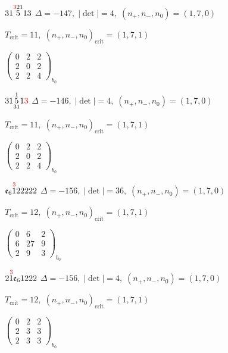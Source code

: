 \documentclass[10pt]{article}
\begin{document}
$31\overset{\textcolor{red}{3}21}{5}13$ \quad $\Delta=-147,\; |\det|=4,\; (n_+,n_-,n_0)=(1,7,0)$

\hspace{1em}$T_{\text{crit}}=11,\; (n_+,n_-,n_0)_{\text{crit}}=(1,7,1)$

\hspace{2em}$\left(\begin{smallmatrix}0 & 2 & 2 \\ 2 & 0 & 2 \\ 2 & 2 & 4\end{smallmatrix}\right)_{\!b_0}$

\smallskip

$31\overset{1}{\underset{31}{5}}1\textcolor{red}{3}$ \quad $\Delta=-146,\; |\det|=4,\; (n_+,n_-,n_0)=(1,7,0)$

\hspace{1em}$T_{\text{crit}}=11,\; (n_+,n_-,n_0)_{\text{crit}}=(1,7,1)$

\hspace{2em}$\left(\begin{smallmatrix}0 & 2 & 2 \\ 2 & 0 & 2 \\ 2 & 2 & 4\end{smallmatrix}\right)_{\!b_0}$

\smallskip

$\mathfrak{e}_6\overset{\textcolor{red}{3}}{1}22222$ \quad $\Delta=-156,\; |\det|=36,\; (n_+,n_-,n_0)=(1,7,0)$

\hspace{1em}$T_{\text{crit}}=12,\; (n_+,n_-,n_0)_{\text{crit}}=(1,7,1)$

\hspace{2em}$\left(\begin{smallmatrix}0 & 6 & 2 \\ 6 & 27 & 9 \\ 2 & 9 & 3\end{smallmatrix}\right)_{\!b_0}$

\smallskip

$2\overset{\textcolor{red}{3}}{1}\mathfrak{e}_61222$ \quad $\Delta=-156,\; |\det|=4,\; (n_+,n_-,n_0)=(1,7,0)$

\hspace{1em}$T_{\text{crit}}=12,\; (n_+,n_-,n_0)_{\text{crit}}=(1,7,1)$

\hspace{2em}$\left(\begin{smallmatrix}0 & 2 & 2 \\ 2 & 3 & 3 \\ 2 & 3 & 3\end{smallmatrix}\right)_{\!b_0}$
\end{document}
